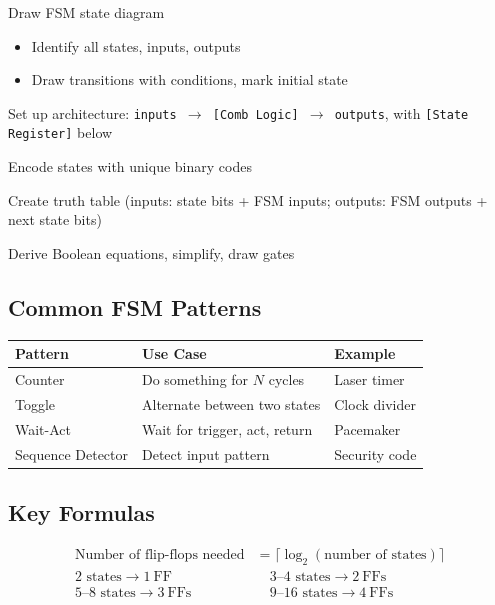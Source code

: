 \documentclass[12pt, a4paper]{article}
\begin{document}
\begin{description}[leftmargin=2.5cm, font=\bfseries]
  \item[Step 1:] Draw FSM state diagram
  \begin{itemize}
    \item Identify all states, inputs, outputs
    \item Draw transitions with conditions, mark initial state
  \end{itemize}
  \item[Step 2A:] Set up architecture: \texttt{inputs $\to$ [Comb Logic] $\to$ outputs}, with \texttt{[State Register]} below
  \item[Step 2B:] Encode states with unique binary codes
  \item[Step 2C:] Create truth table (inputs: state bits + FSM inputs; outputs: FSM outputs + next state bits)
  \item[Step 2D:] Derive Boolean equations, simplify, draw gates
\end{description}

\subsection{Common FSM Patterns}

\begin{table}[H]
\centering
\renewcommand{\arraystretch}{1.4}
\begin{tabular}{@{} l l l @{}}
  \toprule
  \textbf{Pattern} & \textbf{Use Case} & \textbf{Example} \\
  \midrule
  Counter & Do something for $N$ cycles & Laser timer \\
  Toggle & Alternate between two states & Clock divider \\
  Wait-Act & Wait for trigger, act, return & Pacemaker \\
  Sequence Detector & Detect input pattern & Security code \\
  \bottomrule
\end{tabular}
\end{table}

\subsection{Key Formulas}

\begin{align*}
  \text{Number of flip-flops needed} &= \lceil \log_2(\text{number of states}) \rceil \\[8pt]
  \text{2 states} \to 1~\text{FF} \quad&\quad \text{3--4 states} \to 2~\text{FFs} \\
  \text{5--8 states} \to 3~\text{FFs} \quad&\quad \text{9--16 states} \to 4~\text{FFs}
\end{align*}
\end{document}
